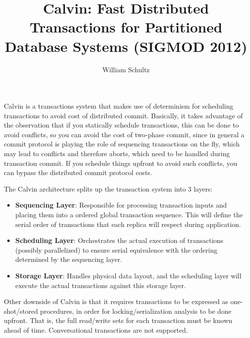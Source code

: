\documentclass[11pt, oneside]{article}   	%
\title{Calvin: Fast Distributed Transactions
for Partitioned Database Systems (SIGMOD 2012)}
\author{William Schultz}
\begin{document}
\maketitle


Calvin \cite{2012calvin} is a transactions system that makes use of determinism for scheduling transactions to avoid cost of distributed commit. Basically, it takes advantage of the observation that if you statically schedule transactions, this can be done to avoid conflicts, so you can avoid the cost of two-phase commit, since in general a commit protocol is playing the role of sequencing transactions on the fly, which may lead to conflicts and therefore aborts, which need to be handled during transaction commit. If you schedule things upfront to avoid such conflicts, you can bypass the distributed commit protocol costs.

The Calvin architecture splits up the transaction system into 3 layers:
\begin{itemize}
    \item \textbf{Sequencing Layer}: Responsible for processing transaction inputs and placing them into a ordered global transaction sequence. This will define the serial order of transactions that each replica will respect during application.
    \item \textbf{Scheduling Layer}: Orchestrates the actual execution of transactions (possibly parallelized) to ensure serial equivalence with the ordering determined by the sequencing layer.
    \item \textbf{Storage Layer}: Handles physical data layout, and the scheduling layer will execute the actual transactions against this storage layer.
\end{itemize}

Other downside of Calvin is that it requires transactions to be expressed as one-shot/stored procedures, in order for locking/serialization analysis to be done upfront. That is, the full read/write sets for each transaction must be known ahead of time. Conversational transactions are not supported.

 

\end{document}
